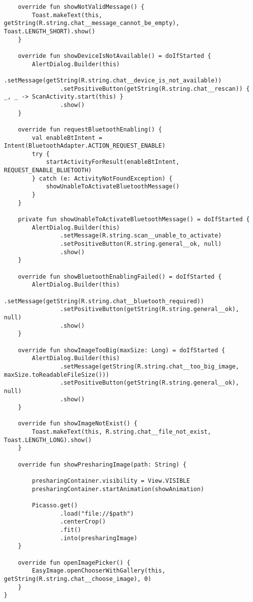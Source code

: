 \begin{lstlisting}
    override fun showNotValidMessage() {
        Toast.makeText(this, getString(R.string.chat__message_cannot_be_empty), Toast.LENGTH_SHORT).show()
    }

    override fun showDeviceIsNotAvailable() = doIfStarted {
        AlertDialog.Builder(this)
                .setMessage(getString(R.string.chat__device_is_not_available))
                .setPositiveButton(getString(R.string.chat__rescan)) { _, _ -> ScanActivity.start(this) }
                .show()
    }

    override fun requestBluetoothEnabling() {
        val enableBtIntent = Intent(BluetoothAdapter.ACTION_REQUEST_ENABLE)
        try {
            startActivityForResult(enableBtIntent, REQUEST_ENABLE_BLUETOOTH)
        } catch (e: ActivityNotFoundException) {
            showUnableToActivateBluetoothMessage()
        }
    }

    private fun showUnableToActivateBluetoothMessage() = doIfStarted {
        AlertDialog.Builder(this)
                .setMessage(R.string.scan__unable_to_activate)
                .setPositiveButton(R.string.general__ok, null)
                .show()
    }

    override fun showBluetoothEnablingFailed() = doIfStarted {
        AlertDialog.Builder(this)
                .setMessage(getString(R.string.chat__bluetooth_required))
                .setPositiveButton(getString(R.string.general__ok), null)
                .show()
    }

    override fun showImageTooBig(maxSize: Long) = doIfStarted {
        AlertDialog.Builder(this)
                .setMessage(getString(R.string.chat__too_big_image, maxSize.toReadableFileSize()))
                .setPositiveButton(getString(R.string.general__ok), null)
                .show()
    }

    override fun showImageNotExist() {
        Toast.makeText(this, R.string.chat__file_not_exist, Toast.LENGTH_LONG).show()
    }

    override fun showPresharingImage(path: String) {

        presharingContainer.visibility = View.VISIBLE
        presharingContainer.startAnimation(showAnimation)

        Picasso.get()
                .load("file://$path")
                .centerCrop()
                .fit()
                .into(presharingImage)
    }

    override fun openImagePicker() {
        EasyImage.openChooserWithGallery(this, getString(R.string.chat__choose_image), 0)
    }
}
\end{lstlisting}
